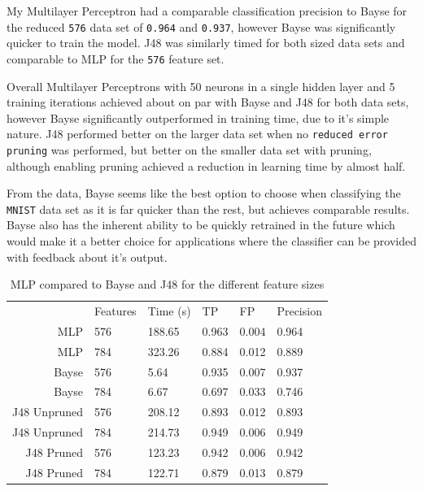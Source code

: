 \documentclass[10pt]{article}
\begin{document}
      My Multilayer Perceptron had a comparable classification precision to Bayse for the reduced \texttt{576} data set of \texttt{0.964} and \texttt{0.937}, however Bayse was significantly quicker to train the model. J48 was similarly timed for both sized data sets and comparable to MLP for the \texttt{576} feature set.

      Overall Multilayer Perceptrons with 50 neurons in a single hidden layer and 5 training iterations achieved about on par with Bayse and J48 for both data sets, however Bayse significantly outperformed in training time, due to it's simple nature. J48 performed better on the larger data set when no \texttt{reduced error pruning} was performed, but better on the smaller data set with pruning, although enabling pruning achieved a reduction in learning time by almost half.

      From the data, Bayse seems like the best option to choose when classifying the \texttt{MNIST} data set as it is far quicker than the rest, but achieves comparable results. Bayse also has the inherent ability to be quickly retrained in the future which would make it a better choice for applications where the classifier can be provided with feedback about it's output. 

      \begin{table}
        \centering
        \begin{tabular}{ | r | l | l | l | l | l | }
          \hline
                       & Features & Time (s) & TP    & FP    & Precision \\ \hhline{|=|=|=|=|=|=|}
          MLP          & 576      & 188.65   & 0.963 & 0.004 & 0.964     \\ \hline
          MLP          & 784      & 323.26   & 0.884 & 0.012 & 0.889     \\ \hhline{|=|=|=|=|=|=|}
          Bayse        & 576      & 5.64     & 0.935 & 0.007 & 0.937     \\ \hline
          Bayse        & 784      & 6.67     & 0.697 & 0.033 & 0.746     \\ \hhline{|=|=|=|=|=|=|}
          J48 Unpruned & 576      & 208.12   & 0.893 & 0.012 & 0.893     \\ \hline
          J48 Unpruned & 784      & 214.73   & 0.949 & 0.006 & 0.949     \\ \hhline{|=|=|=|=|=|=|}
          J48 Pruned   & 576      & 123.23   & 0.942 & 0.006 & 0.942     \\ \hline
          J48 Pruned   & 784      & 122.71   & 0.879 & 0.013 & 0.879     \\ \hline
        \end{tabular}

        \caption{MLP compared to Bayse and J48 for the different feature sizes}
        \label{table:mlpComparison}
      \end{table}
\end{document}
